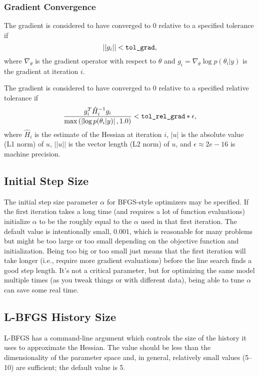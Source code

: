 \subsubsection{Gradient Convergence}

The gradient is considered to have converged to 0 relative to a
specified tolerance  if
%
\[
|| g_{i} || < \mbox{\code{tol\_grad}},
\]
where $\nabla_{\theta}$ is the gradient operator with respect to
$\theta$ and $g_{i} = \nabla_{\theta} \log p(\theta_{i}|y)$ is the gradient at
iteration $i$.

The gradient is considered to have converged to 0 relative to a
specified relative tolerance
 if
%
\[
\frac{g_{i}^T \hat{H}_{i}^{-1} g_{i} }{ \max\left(\left|\log p(\theta_{i}|y)\right|,1.0\right) } < \mbox{\code{tol\_rel\_grad}} * \epsilon,
\]
%
where $\hat{H}_{i}$ is the estimate of the Hessian at iteration $i$,
$|u|$ is the absolute value (L1 norm) of $u$, $||u||$ is the vector
length (L2 norm) of $u$, and $\epsilon \approx 2e-16$ is machine
precision.


\subsection{Initial Step Size}

The initial step size parameter $\alpha$ for BFGS-style optimizers may
be specified. If the first iteration takes a long time (and requires a
lot of function evaluations) initialize $\alpha$ to be the roughly
equal to the $\alpha$ used in that first iteration. The default value
is intentionally small, 0.001, which is reasonable for many problems
but might be too large or too small depending on the objective
function and initialization. Being too big or too small just means
that the first iteration will take longer (i.e., require more gradient
evaluations) before the line search finds a good step length. It's not
a critical parameter, but for optimizing the same model multiple times
(as you tweak things or with different data), being able to tune
$\alpha$ can save some real time.

\subsection{L-BFGS History Size}

L-BFGS has a command-line argument which controls the size of the
history it uses to approximate the Hessian. The value should be less than
the dimensionality of the parameter space and, in general, relatively
small values (5--10) are sufficient; the default value is 5.

